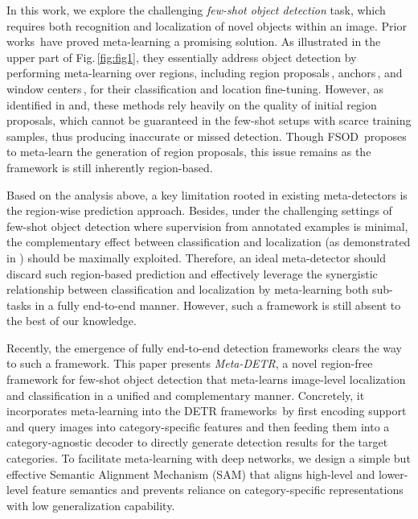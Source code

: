 \documentclass[10pt,twocolumn,letterpaper]{article}
\begin{document}
In this work, we explore the challenging \textit{few-shot object detection} task, which requires both recognition and localization of novel objects within an image. Prior works\,\cite{FewshotReweighting,incrementalfsdet,metadet,metarcnn,fsod,FSDetView} have proved meta-learning a promising solution. As illustrated in the upper part of Fig.\,\ref{fig:fig1}, they essentially address object detection by performing meta-learning over regions, including region proposals\,\cite{metarcnn,FSDetView}, anchors\,\cite{FewshotReweighting}, and window centers\,\cite{incrementalfsdet}, for their classification and location fine-tuning. However, as identified in\;\cite{fsod} and\;\cite{CoRPN}, these methods rely heavily on the quality of initial region proposals, which cannot be guaranteed in the few-shot setups with scarce training samples, thus producing inaccurate or missed detection.
Though FSOD\,\cite{fsod} proposes to meta-learn the generation of region proposals, this issue remains as the framework is still inherently region-based.

\newpage
Based on the analysis above, a key limitation rooted in existing meta-detectors is the region-wise prediction approach.
Besides, under the challenging settings of few-shot object detection where supervision from annotated examples is minimal, the complementary effect between classification and localization (as demonstrated in \cite{CAM,RethinkLocAndCls,ren-cvpr020}) should be maximally exploited. 
Therefore, an ideal meta-detector should discard such region-based prediction and effectively leverage the synergistic relationship between classification and localization by meta-learning both sub-tasks in a fully end-to-end manner. However, such a framework is still absent to the best of our knowledge.

Recently, the emergence of fully end-to-end detection frameworks\;\cite{DETR,DeformableDETR} clears the way to such a framework. This paper presents \textit{Meta-DETR}, a novel region-free framework for few-shot object detection that meta-learns image-level localization and classification in a unified and complementary manner. Concretely, it incorporates meta-learning into the DETR frameworks\,\cite{DETR,DeformableDETR} by first encoding support and query images into category-specific features and then feeding them into a category-agnostic decoder to directly generate detection results for the target categories. To facilitate meta-learning with deep networks, we design a simple but effective Semantic Alignment Mechanism (SAM) that aligns high-level and lower-level feature semantics and prevents reliance on category-specific representations with low generalization capability.
\end{document}
